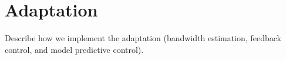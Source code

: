 \section{Adaptation}
\label{sec:adaptation}

Describe how we implement the adaptation (bandwidth estimation, feedback
control, and model predictive control).

